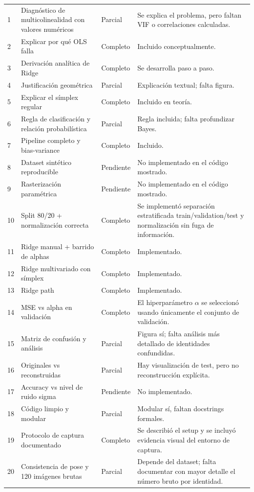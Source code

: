 \documentclass[12pt,a4paper]{article}
\begin{document}
\begin{longtable}{p{1.2cm} p{6cm} p{3cm} p{4.2cm}}
1 & Diagnóstico de multicolinealidad con valores numéricos & Parcial & Se explica el problema, pero faltan VIF o correlaciones calculadas. \\
2 & Explicar por qué OLS falla & Completo & Incluido conceptualmente. \\
3 & Derivación analítica de Ridge & Completo & Se desarrolla paso a paso. \\
4 & Justificación geométrica & Parcial & Explicación textual; falta figura. \\
5 & Explicar el símplex regular & Completo & Incluido en teoría. \\
6 & Regla de clasificación y relación probabilística & Parcial & Regla incluida; falta profundizar Bayes. \\
7 & Pipeline completo y bias-variance & Completo & Incluido. \\
8 & Dataset sintético reproducible & Pendiente & No implementado en el código mostrado. \\
9 & Rasterización paramétrica & Pendiente & No implementado en el código mostrado. \\
10 & Split 80/20 + normalización correcta & Completo & Se implementó separación estratificada train/validation/test y normalización sin fuga de información. \\
11 & Ridge manual + barrido de alphas & Completo & Implementado. \\
12 & Ridge multivariado con símplex & Completo & Implementado. \\
13 & Ridge path & Completo & Implementado. \\
14 & MSE vs alpha en validación & Completo & El hiperparámetro $\alpha$ se seleccionó usando únicamente el conjunto de validación. \\
15 & Matriz de confusión y análisis & Parcial & Figura sí; falta análisis más detallado de identidades confundidas. \\
16 & Originales vs reconstruidas & Parcial & Hay visualización de test, pero no reconstrucción explícita. \\
17 & Accuracy vs nivel de ruido sigma & Pendiente & No implementado. \\
18 & Código limpio y modular & Parcial & Modular sí, faltan docstrings formales. \\
19 & Protocolo de captura documentado & Completo & Se describió el setup y se incluyó evidencia visual del entorno de captura. \\
20 & Consistencia de pose y 120 imágenes brutas & Parcial & Depende del dataset; falta documentar con mayor detalle el número bruto por identidad. \\

\end{longtable}
\end{document}
